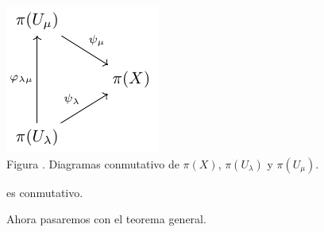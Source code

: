\documentclass[12pt]{report}
\theoremstyle{largebreak}
\newcounter{figcount}
\begin{document}
    \begin{minipage}{\textwidth}
        \begin{center}
            \includegraphics[scale=1.5]{images/fig_3.pdf}\\
            Figura \thefigcount. Diagramas conmutativo de $\pi(X)$, $\pi(U_\lambda)$ y $\pi(U_\mu)$.
        \end{center}
    \end{minipage}

    es conmutativo.
    
    Ahora pasaremos con el teorema general.
\end{document}
